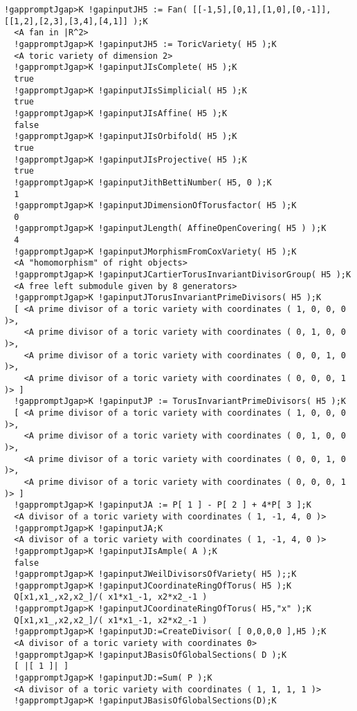 \documentclass[a4paper,11pt]{report}
\begin{document}
{{{\begin{Verbatim}[commandchars=!JK,fontsize=\small,frame=single,label=Example]
  !gappromptJgap>K !gapinputJH5 := Fan( [[-1,5],[0,1],[1,0],[0,-1]],[[1,2],[2,3],[3,4],[4,1]] );K
  <A fan in |R^2>
  !gappromptJgap>K !gapinputJH5 := ToricVariety( H5 );K
  <A toric variety of dimension 2>
  !gappromptJgap>K !gapinputJIsComplete( H5 );K
  true
  !gappromptJgap>K !gapinputJIsSimplicial( H5 );K
  true
  !gappromptJgap>K !gapinputJIsAffine( H5 );K
  false
  !gappromptJgap>K !gapinputJIsOrbifold( H5 );K
  true
  !gappromptJgap>K !gapinputJIsProjective( H5 );K
  true
  !gappromptJgap>K !gapinputJithBettiNumber( H5, 0 );K
  1
  !gappromptJgap>K !gapinputJDimensionOfTorusfactor( H5 );K
  0
  !gappromptJgap>K !gapinputJLength( AffineOpenCovering( H5 ) );K
  4
  !gappromptJgap>K !gapinputJMorphismFromCoxVariety( H5 );K
  <A "homomorphism" of right objects>
  !gappromptJgap>K !gapinputJCartierTorusInvariantDivisorGroup( H5 );K
  <A free left submodule given by 8 generators>
  !gappromptJgap>K !gapinputJTorusInvariantPrimeDivisors( H5 );K
  [ <A prime divisor of a toric variety with coordinates ( 1, 0, 0, 0 )>,
    <A prime divisor of a toric variety with coordinates ( 0, 1, 0, 0 )>,
    <A prime divisor of a toric variety with coordinates ( 0, 0, 1, 0 )>,
    <A prime divisor of a toric variety with coordinates ( 0, 0, 0, 1 )> ]
  !gappromptJgap>K !gapinputJP := TorusInvariantPrimeDivisors( H5 );K
  [ <A prime divisor of a toric variety with coordinates ( 1, 0, 0, 0 )>,
    <A prime divisor of a toric variety with coordinates ( 0, 1, 0, 0 )>,
    <A prime divisor of a toric variety with coordinates ( 0, 0, 1, 0 )>,
    <A prime divisor of a toric variety with coordinates ( 0, 0, 0, 1 )> ]
  !gappromptJgap>K !gapinputJA := P[ 1 ] - P[ 2 ] + 4*P[ 3 ];K
  <A divisor of a toric variety with coordinates ( 1, -1, 4, 0 )>
  !gappromptJgap>K !gapinputJA;K
  <A divisor of a toric variety with coordinates ( 1, -1, 4, 0 )>
  !gappromptJgap>K !gapinputJIsAmple( A );K
  false
  !gappromptJgap>K !gapinputJWeilDivisorsOfVariety( H5 );;K
  !gappromptJgap>K !gapinputJCoordinateRingOfTorus( H5 );K
  Q[x1,x1_,x2,x2_]/( x1*x1_-1, x2*x2_-1 )
  !gappromptJgap>K !gapinputJCoordinateRingOfTorus( H5,"x" );K
  Q[x1,x1_,x2,x2_]/( x1*x1_-1, x2*x2_-1 )
  !gappromptJgap>K !gapinputJD:=CreateDivisor( [ 0,0,0,0 ],H5 );K
  <A divisor of a toric variety with coordinates 0>
  !gappromptJgap>K !gapinputJBasisOfGlobalSections( D );K
  [ |[ 1 ]| ]
  !gappromptJgap>K !gapinputJD:=Sum( P );K
  <A divisor of a toric variety with coordinates ( 1, 1, 1, 1 )>
  !gappromptJgap>K !gapinputJBasisOfGlobalSections(D);K

\end{Verbatim}}}}
\end{document}
